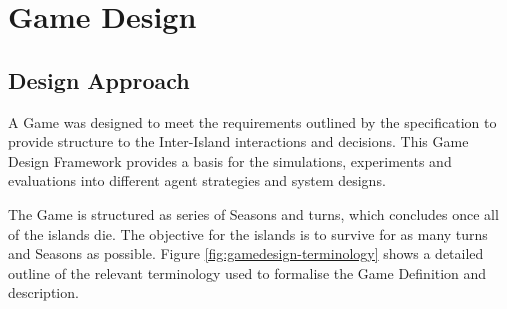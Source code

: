 \chapter{Game Design}

\section{Design Approach}

A Game was designed to meet the requirements outlined by the specification to provide structure to the Inter-Island interactions and decisions. This Game Design Framework provides a basis for the simulations, experiments and evaluations into different agent strategies and system designs.

The Game is structured as series of Seasons and turns, which concludes once all of the islands die. The objective for the islands is to survive for as many turns and Seasons as possible. Figure \ref{fig:gamedesign-terminology} shows a detailed outline of the relevant terminology used to formalise the Game Definition and description.

